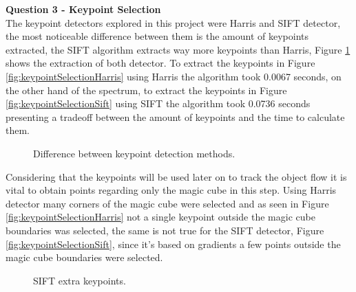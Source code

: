 \documentclass[12pt,a4paper]{article}
\begin{document}
\textbf{\LARGE Question 3 - Keypoint Selection} \\

	The keypoint detectors explored in this project were Harris and SIFT detector, the most noticeable difference between them is the amount of keypoints extracted, the SIFT algorithm extracts way more keypoints than Harris, Figure \ref{fig:keypointSelection} shows the extraction of both detector. To extract the keypoints in Figure \ref{fig:keypointSelectionHarris} using Harris the algorithm took 0.0067 seconds, on the other hand of the spectrum, to extract the keypoints in Figure \ref{fig:keypointSelectionSift} using SIFT the algorithm took 0.0736 seconds presenting a tradeoff between the amount of keypoints and the time to calculate them.\\

\begin{figure}[!h]
	\centering
	\quad
	\caption{Difference between keypoint detection methods.}
	\label{fig:keypointSelection}
\end{figure}

	Considering that the keypoints will be used later on to track the object flow it is vital to obtain points regarding only the magic cube in this step. Using Harris detector many corners of the magic cube were selected and as seen in Figure \ref{fig:keypointSelectionHarris} not a single keypoint outside the magic cube boundaries was selected, the same is not true for the SIFT detector, Figure \ref{fig:keypointSelectionSift}, since it's based on gradients a few points outside the magic cube boundaries were selected.
	
\begin{figure}[!h]
	\centering
	{
		\setlength{\fboxsep}{1pt}
		\setlength{\fboxrule}{1pt}
	}
	\caption{SIFT extra keypoints.}
	\label{fig:keypointSelectionSiftPoints}
\end{figure}
\end{document}
